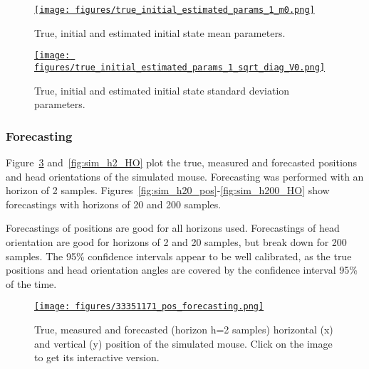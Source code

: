 \documentclass[12pt]{article}
\begin{document}
\begin{figure}
    \centering
    \href{https://www.gatsby.ucl.ac.uk/~rapela/aman/reports/ekfForKinematicsAndHeadOrientation/figures/true_initial_estimated_params_1_m0.png}{\texttt{[image: figures/true\_initial\_estimated\_params\_1\_m0.png]}}

    \caption{True, initial and estimated initial state mean parameters.}

    \label{fig:m0_params}
\end{figure}

\begin{figure}
    \centering
    \href{https://www.gatsby.ucl.ac.uk/~rapela/aman/reports/ekfForKinematicsAndHeadOrientation/figures/true_initial_estimated_params_1_sqrt_diag_V0.png}{\texttt{[image: figures/true\_initial\_estimated\_params\_1\_sqrt\_diag\_V0.png]}}

    \caption{True, initial and estimated initial state standard deviation parameters.}

    \label{fig:sqrt_diag_V0_params}
\end{figure}

\subsubsection*{Forecasting}

Figure~\ref{fig:sim_h2_pos} and~\ref{fig:sim_h2_HO} plot the true, measured and forecasted positions
and head orientations of the simulated mouse. Forecasting was performed with an horizon of 2 samples.
%
Figures~\ref{fig:sim_h20_pos}-\ref{fig:sim_h200_HO} show forecastings with horizons of 20 and 200 samples.

Forecastings of positions are good for all horizons used. Forecastings of head
orientation are good for horizons of 2 and 20 samples, but break down for 200
samples.
%
The 95\% confidence intervals appear to be well calibrated, as the true
positions and head orientation angles are covered by the confidence interval
95\% of the time.

\begin{figure}
    \centering
    \href{https://www.gatsby.ucl.ac.uk/~rapela/aman/reports/ekfForKinematicsAndHeadOrientation/figures/33351171_pos_forecasting.html}{\texttt{[image: figures/33351171\_pos\_forecasting.png]}}
    \caption{True, measured and forecasted (horizon h=2 samples) horizontal (x) and vertical (y)
    position of the simulated mouse. Click on the image to get its
    interactive version.}
    \label{fig:sim_h2_pos}
\end{figure}
\end{document}
